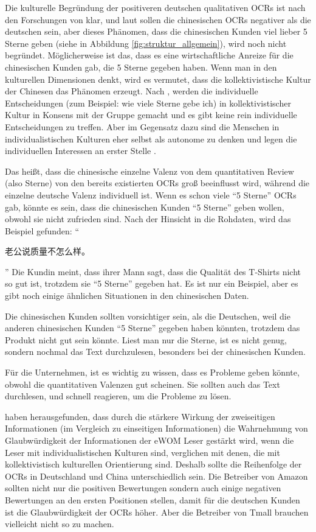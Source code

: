 Die kulturelle Begründung der positiveren deutschen qualitativen \ac{OCRs} ist nach den Forschungen von \citet{donthu1998cultural} klar, und laut \citet{liu2001relationships} sollen die chinesischen \ac{OCRs} negativer als die deutschen sein, aber dieses Phänomen, dass die chinesischen Kunden viel lieber 5 Sterne geben (siehe in Abbildung \ref{fig:struktur_allgemein}), wird noch nicht begründet. Möglicherweise ist das, dass es eine wirtschaftliche Anreize für die chinesischen Kunden gab, die 5 Sterne gegeben haben. Wenn man in den kulturellen Dimensionen denkt, wird es vermutet, dass die kollektivistische Kultur der Chinesen das Phänomen erzeugt. Nach \citet[p. ~65]{hofstede1998masculinity}, werden die individuelle Entscheidungen (zum Beispiel: wie viele Sterne gebe ich) in kollektivistischer Kultur in Konsens mit der Gruppe gemacht und es gibt keine rein individuelle Entscheidungen zu treffen. Aber im Gegensatz dazu sind die Menschen in individualistischen Kulturen eher selbst als autonome zu denken und legen die individuellen Interessen an erster Stelle \citep{shweder1990defense}. 

Das heißt, dass die chinesische einzelne Valenz von dem quantitativen Review (also Sterne) von den bereits existierten \ac{OCRs} groß beeinflusst wird, während die einzelne deutsche Valenz individuell ist. Wenn es schon viele ``5 Sterne'' \ac{OCRs} gab, könnte es sein, dass die chinesischen Kunden ``5 Sterne'' geben wollen, obwohl sie nicht zufrieden sind. Nach der Hinsicht in die Rohdaten, wird das Beispiel gefunden: ``
\begin{CJK*}{UTF8}{gbsn}
	老公说质量不怎么样。
\end{CJK*}
'' Die Kundin meint, dass ihrer Mann sagt, dass die Qualität des T-Shirts nicht so gut ist, trotzdem sie ``5 Sterne'' gegeben hat. Es ist nur ein Beispiel, aber es gibt noch einige ähnlichen Situationen in den chinesischen Daten.

Die chinesischen Kunden sollten vorsichtiger sein, als die Deutschen, weil die anderen chinesischen Kunden ``5 Sterne'' gegeben haben könnten, trotzdem das Produkt nicht gut sein könnte. Liest man nur die Sterne, ist es nicht genug, sondern nochmal das Text durchzulesen, besonders bei der chinesischen Kunden.

Für die Unternehmen, ist es wichtig zu wissen, dass es Probleme geben könnte, obwohl die quantitativen Valenzen gut scheinen. Sie sollten auch das Text durchlesen, und schnell reagieren, um die Probleme zu lösen. 

\citet{Luo2014} haben herausgefunden, dass durch die stärkere Wirkung der zweiseitigen Informationen (im Vergleich zu einseitigen Informationen) die Wahrnehmung von Glaubwürdigkeit der Informationen der \ac{eWOM} Leser gestärkt wird, wenn die Leser mit individualistischen Kulturen sind, verglichen mit denen, die mit kollektivistisch kulturellen Orientierung sind. Deshalb sollte die Reihenfolge der \ac{OCRs} in Deutschland und China unterschiedlich sein. Die Betreiber von Amazon sollten nicht nur die positiven Bewertungen sondern auch einige negativen Bewertungen an den ersten Positionen stellen, damit für die deutschen Kunden ist die Glaubwürdigkeit der \ac{OCRs} höher. Aber die Betreiber von Tmall brauchen vielleicht nicht so zu machen.
